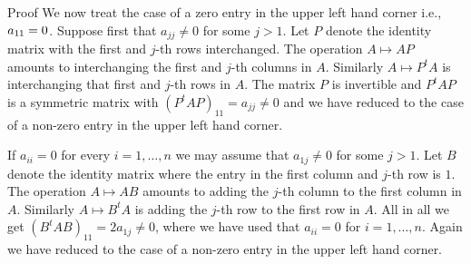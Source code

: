 \documentclass{article}
\begin{document}
\begin{hideinbutton}{Proof}
We now treat the case of a zero entry in the upper left hand corner
  i.e., $a_{11}=\nobreak 0$.  Suppose first that $a_{jj} \neq 0$ for
  some $j > 1$. Let $P$ denote the identity matrix with the first and
  $j$-th rows interchanged.  The operation $A\mapsto A P$ amounts to
  interchanging the first and $j$-th columns in $A$.  Similarly
  $A\mapsto P^t A$ is interchanging that first and $j$-th rows in $A$.
  The matrix $P$ is invertible and $P^t A P$ is a symmetric matrix
  with $(P^t A P)_{11} = a_{jj}\neq 0$ and we have reduced to the case
  of a non-zero entry in the upper left hand corner.

  If $a_{ii} = 0$ for every $i = 1, \dots, n$ we may assume that $a_{1
    j}\neq 0$ for some $j>1$. Let $B$ denote the identity matrix where
  the entry in the first column and $j$-th row is $1$. The operation
  $A\mapsto A B$ amounts to adding the $j$-th column to the first
  column in $A$. Similarly $A\mapsto B^t A$ is adding the $j$-th row
  to the first row in $A$. All in all we get $(B^t A B)_{11} = 2 a_{1
    j} \neq 0$, where we have used that $a_{ii} = 0$ for $i=1, \dots,
  n$. Again we have reduced to the case of a non-zero entry in the
  upper left hand corner.
\end{hideinbutton}
\end{document}
